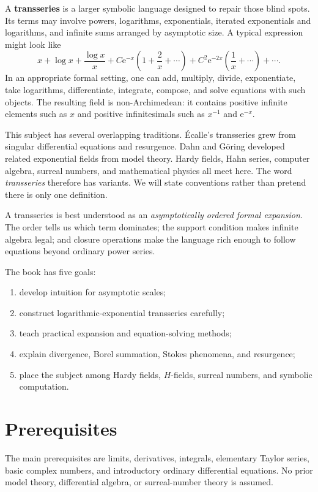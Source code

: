 \documentclass[11pt,oneside,openany]{book}
\newcommand{\e}{\mathrm{e}}
\theoremstyle{plain}
\theoremstyle{definition}
\theoremstyle{remark}
\newcommand{\term}[1]{\textbf{#1}}
\begin{document}
A \term{transseries} is a larger symbolic language designed to repair those blind spots. Its terms may involve powers, logarithms, exponentials, iterated exponentials and logarithms, and infinite sums arranged by asymptotic size. A typical expression might look like
\[
  x+\log x+\frac{\log x}{x}
  +C\e^{-x}\left(1+\frac{2}{x}+\cdots\right)
  +C^2\e^{-2x}\left(\frac1x+\cdots\right)+\cdots.
\]
In an appropriate formal setting, one can add, multiply, divide, exponentiate, take logarithms, differentiate, integrate, compose, and solve equations with such objects. The resulting field is non-Archimedean: it contains positive infinite elements such as $x$ and positive infinitesimals such as $x^{-1}$ and $\e^{-x}$.

This subject has several overlapping traditions. Écalle's transseries grew from singular differential equations and resurgence. Dahn and Göring developed related exponential fields from model theory. Hardy fields, Hahn series, computer algebra, surreal numbers, and mathematical physics all meet here. The word \emph{transseries} therefore has variants. We will state conventions rather than pretend there is only one definition.

\begin{bigidea}
A transseries is best understood as an \emph{asymptotically ordered formal expansion}. The order tells us which term dominates; the support condition makes infinite algebra legal; and closure operations make the language rich enough to follow equations beyond ordinary power series.
\end{bigidea}

The book has five goals:
\begin{enumerate}
  \item develop intuition for asymptotic scales;
  \item construct logarithmic-exponential transseries carefully;
  \item teach practical expansion and equation-solving methods;
  \item explain divergence, Borel summation, Stokes phenomena, and resurgence;
  \item place the subject among Hardy fields, $H$-fields, surreal numbers, and symbolic computation.
\end{enumerate}

\section*{Prerequisites}
The main prerequisites are limits, derivatives, integrals, elementary Taylor series, basic complex numbers, and introductory ordinary differential equations. No prior model theory, differential algebra, or surreal-number theory is assumed.
\end{document}
